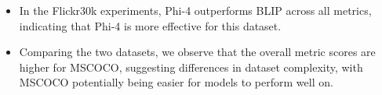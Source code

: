 \documentclass{article}
\begin{document}
\begin{enumerate}
\begin{itemize}
		\item In the Flickr30k experiments, Phi-4 outperforms BLIP across all metrics, indicating that Phi-4 is more effective for this dataset.

		\item Comparing the two datasets, we observe that the overall metric scores are higher for MSCOCO, suggesting differences in dataset complexity, with MSCOCO potentially being easier for models to perform well on.
	\end{itemize}
	\end{enumerate}
\end{document}
